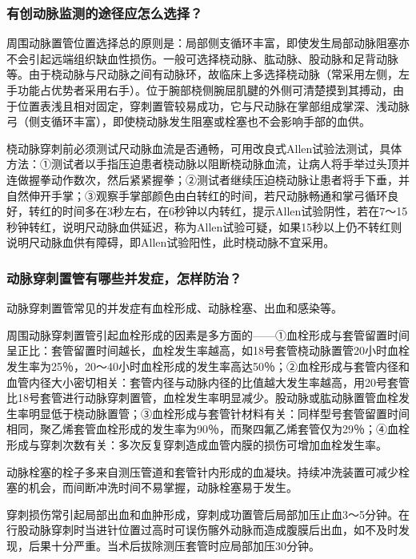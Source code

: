 \subsubsection{有创动脉监测的途径应怎么选择？}

周围动脉置管位置选择总的原则是：局部侧支循环丰富，即使发生局部动脉阻塞亦不会引起远端组织缺血性损伤。一般可选择桡动脉、肱动脉、股动脉和足背动脉等。由于桡动脉与尺动脉之间有动脉环，故临床上多选择桡动脉（常采用左侧，左手功能占优势者采用右手）。位于腕部桡侧腕屈肌腱的外侧可清楚摸到其搏动，由于位置表浅且相对固定，穿刺置管较易成功，它与尺动脉在掌部组成掌深、浅动脉弓（侧支循环丰富），即使桡动脉发生阻塞或栓塞也不会影响手部的血供。

桡动脉穿刺前必须测试尺动脉血流是否通畅，可用改良式Allen试验法测试，具体方法：①测试者以手指压迫患者桡动脉以阻断桡动脉血流，让病人将手举过头顶并连做握拳动作数次，然后紧紧握拳；②测试者继续压迫桡动脉让患者将手下垂，并自然伸开手掌；③观察手掌部颜色由白转红的时间，若尺动脉畅通和掌弓循环良好，转红的时间多在3秒左右，在6秒钟以内转红，提示Allen试验阴性，若在7～15秒钟转红，说明尺动脉血供延迟，称为Allen试验可疑，如果15秒以上仍不转红则说明尺动脉血供有障碍，即Allen试验阳性，此时桡动脉不宜采用。

\subsubsection{动脉穿刺置管有哪些并发症，怎样防治？}

动脉穿刺置管常见的并发症有血栓形成、动脉栓塞、出血和感染等。

周围动脉穿刺置管引起血栓形成的因素是多方面的------①血栓形成与套管留置时间呈正比：套管留置时间越长，血栓发生率越高，如18号套管桡动脉置管20小时血栓发生率为25％，20～40小时血栓形成的发生率高达50％；②血栓形成与套管内径和血管内径大小密切相关：套管内径与动脉内径的比值越大发生率越高，用20号套管比18号套管进行动脉穿刺置管，血栓发生率明显减少。股动脉或肱动脉置管血栓发生率明显低于桡动脉置管；③血栓形成与套管针材料有关：同样型号套管留置时间相同，聚乙烯套管血栓形成的发生率为90％，而聚四氟乙烯套管仅为29％；④血栓形成与穿刺次数有关：多次反复穿刺造成血管内膜的损伤可增加血栓发生率。

动脉栓塞的栓子多来自测压管道和套管针内形成的血凝块。持续冲洗装置可减少栓塞的机会，而间断冲洗时间不易掌握，动脉栓塞易于发生。

穿刺损伤常引起局部出血和血肿形成，穿刺成功置管后局部加压止血3～5分钟。在行股动脉穿刺时当进针位置过高时可误伤髂外动脉而造成腹膜后出血，如不及时发现，后果十分严重。当术后拔除测压套管时应局部加压30分钟。

